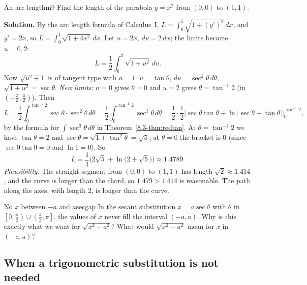\documentclass[11pt]{article}
\begin{document}
\begin{exmp}{An arc length}{m9}
Find the length of the parabola $y=x^2$ from $(0,0)$ to $(1,1)$.

\textbf{Solution.} By the arc length formula of Calculus~I, $L=\int_0^1\sqrt{1+(y')^2}\,dx$, and $y'=2x$, so $L=\int_0^1\sqrt{1+4x^2}\,dx$. Let $u=2x$, $du=2\,dx$; the limits become $u=0,2$:
\[L=\frac12\int_0^2\sqrt{1+u^2}\,du .\]
Now $\sqrt{u^2+1}$ is of tangent type with $a=1$: $u=\tan\theta$, $du=\sec^2\theta\,d\theta$, $\sqrt{1+u^2}=\sec\theta$. \emph{New limits:} $u=0$ gives $\theta=0$ and $u=2$ gives $\theta=\tan^{-1}2$ (in $\left(-\frac\pi2,\frac\pi2\right)$). Then
\[L=\frac12\int_0^{\tan^{-1}2}\sec\theta\cdot\sec^2\theta\,d\theta=\frac12\int_0^{\tan^{-1}2}\sec^3\theta\,d\theta=\frac12\cdot\frac12\Big[\sec\theta\tan\theta+\ln\lvert\sec\theta+\tan\theta\rvert\Big]_0^{\tan^{-1}2},\]
by the formula for $\int\sec^3\theta\,d\theta$ in Theorem~\ref{8.3-thm:redtan}. At $\theta=\tan^{-1}2$ we have $\tan\theta=2$ and $\sec\theta=\sqrt{1+\tan^2\theta}=\sqrt5$; at $\theta=0$ the bracket is $0$ (since $\sec0\tan0=0$ and $\ln1=0$). So
\[L=\frac14\Big(2\sqrt5+\ln\big(2+\sqrt5\big)\Big)\approx1.4789 .\]
\emph{Plausibility.} The straight segment from $(0,0)$ to $(1,1)$ has length $\sqrt2\approx1.414$, and the curve is longer than the chord, so $1.479>1.414$ is reasonable. The path along the axes, with length $2$, is longer than the curve.
\end{exmp}

\begin{think}{No $x$ between $-a$ and $a$}{secgap}
In the secant substitution $x=a\sec\theta$ with $\theta$ in $\left[0,\frac\pi2\right)\cup\left(\frac\pi2,\pi\right]$, the values of $x$ never fill the interval $(-a,a)$. Why is this exactly what we want for $\sqrt{x^2-a^2}$? What would $\sqrt{x^2-a^2}$ mean for $x$ in $(-a,a)$?
\end{think}

\subsection*{When a trigonometric substitution is not needed}
\end{document}
